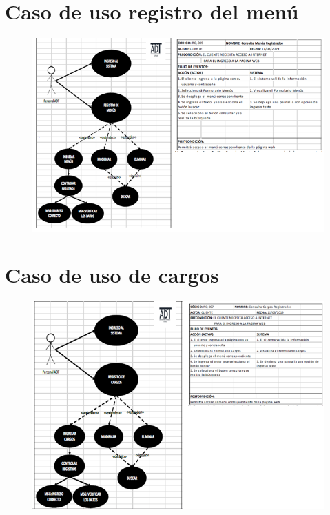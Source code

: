 \documentclass[12pt,a4paper]{article}
\begin{document}
\section*{Caso de uso registro del menú}
\begin{figure}[hbtp]
\caption{}
\centering
\includegraphics[scale=0.7]{OCTAVA.png}
\end{figure}



\section*{Caso de uso de cargos}
\begin{figure}[hbtp]
\caption{}
\centering
\includegraphics[scale=0.6]{NOVENA.png}
\end{figure}
\end{document}
